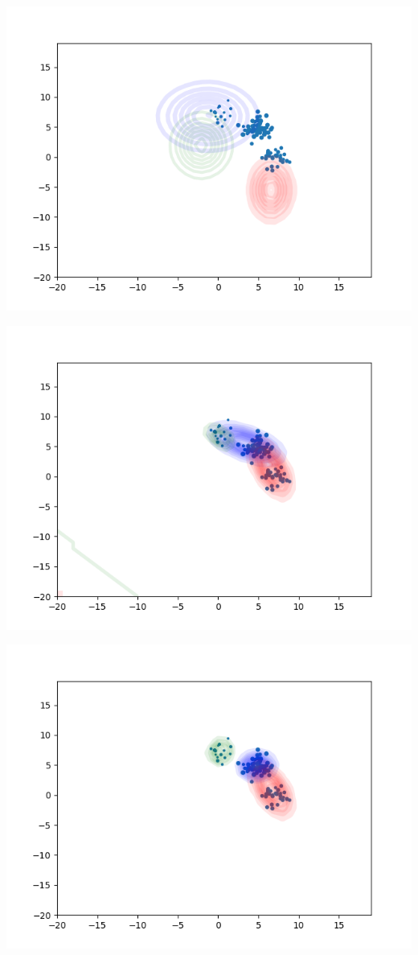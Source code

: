 \documentclass[11pt,a4paper]{article}
\begin{document}
\begin{center}
\includegraphics[width=\textwidth]{1_k=3.png}
\end{center}
\begin{center}
\includegraphics[width=\textwidth]{2_k=3.png}
\end{center}
\begin{center}
\includegraphics[width=\textwidth]{3_k=3.png}
\end{center}
\end{document}
